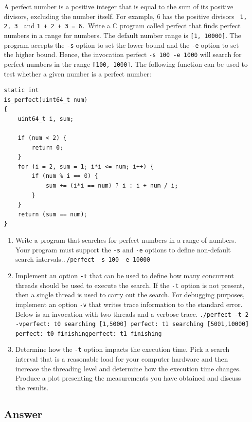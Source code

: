 \documentclass[
	12pt, %
]{fphw}
\begin{document}
\begin{problem}
A perfect number is a positive integer that is equal to the sum of its positive divisors, excluding the
number itself. For example, 6 has the positive divisors \texttt{{ 1, 2, 3 }} and \texttt{1 + 2 + 3 = 6.}
Write a C program called perfect that finds perfect numbers in a range for numbers. The default
number range is \texttt{[1, 10000]}. The program accepts the \texttt{-s} option to set the lower bound and the
\texttt{-e} option to set the higher bound. Hence, the invocation perfect \texttt{-s 100 -e 1000} will search for
perfect numbers in the range \texttt{[100, 1000]}.
The following function can be used to test whether a given number is a perfect number:
\end{problem}
\begin{lstlisting}[style=CStyle]
static int
is_perfect(uint64_t num)
{
	uint64_t i, sum;

	if (num < 2) {
		return 0;
	}
	for (i = 2, sum = 1; i*i <= num; i++) {
		if (num % i == 0) {
			sum += (i*i == num) ? i : i + num / i;
		}
	}
	return (sum == num);
}
\end{lstlisting}	
\begin{enumerate}
	\item Write a program that searches for perfect numbers in a range of numbers. Your program must support the \texttt{-s} and \texttt{-e} options to define non-default search intervals.\newline \texttt{./perfect -s 100 -e 10000  }

	\item Implement an option \texttt{-t} that can be used to define how many concurrent threads should be used to execute the search. If the \texttt{-t} option is not present, then a single thread is used to carry out the search. For debugging purposes, implement an option \texttt{-v} that writes trace information to the standard error. Below is an invocation with two threads and a verbose trace. \newline \texttt{./perfect -t 2 -v\newline perfect: t0 searching [1,5000] \newline perfect: t1 searching [5001,10000]  \newline perfect: t0 finishing\newline perfect: t1 finishing}
	\item Determine how the \texttt{-t} option impacts the execution time. Pick a search interval that is a reasonable load for your computer hardware and then increase the threading level and determine how the execution time changes. Produce a plot presenting the measurements you have obtained and discuss the results.
\end{enumerate}

\subsection*{Answer}

\end{document}
